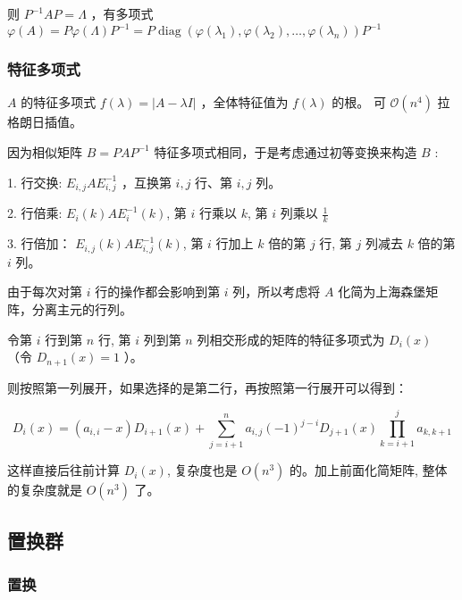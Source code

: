 \vspace{-0.2cm}

则 $P^{-1} A P=\Lambda$ ，有多项式 $\varphi(A)=P \varphi(\Lambda) P^{-1} = P \operatorname{diag}(\varphi(\lambda_1),\varphi(\lambda_2),\dots,\varphi(\lambda_n))P^{-1}$

\subsubsection*{特征多项式}

\vspace{-0.1cm}

$A$ 的特征多项式 $f(\lambda) = |A - \lambda I|$ ，全体特征值为 $f(\lambda)$ 的根。 可 $\mathcal{O}(n^4)$ 拉格朗日插值。

因为相似矩阵 $B=PAP^{-1}$ 特征多项式相同，于是考虑通过初等变换来构造 $B$ :

1. 行交换: $E_{i, j} A E_{i, j}^{-1}$ ，互换第 $i, j$ 行、第 $i, j$ 列。

2. 行倍乘: $E_{i}(k) A E_{i}^{-1}(k)$, 第 $i$ 行乘以 $k$, 第 $i$ 列乘以 $\frac{1}{k}$

3. 行倍加： $E_{i, j}(k) A E_{i, j}^{-1}(k)$, 第 $i$ 行加上 $k$ 倍的第 $j$ 行, 第 $j$ 列减去 $k$ 倍的第 $i$ 列。

由于每次对第 $i$ 行的操作都会影响到第 $i$ 列，所以考虑将 $A$ 化简为上海森堡矩阵，分离主元的行列。

\vspace{0.2cm}

令第 $i$ 行到第 $n$ 行, 第 $i$ 列到第 $n$ 列相交形成的矩阵的特征多项式为 $D_{i}(x)$ （令 $D_{n+1}(x)=1$ ）。

则按照第一列展开，如果选择的是第二行，再按照第一行展开可以得到：

\vspace{-0.3cm}

$$
D_{i}(x)=\left(a_{i, i}-x\right) D_{i+1}(x)+\sum_{j=i+1}^{n} a_{i, j}(-1)^{j-i} D_{j+1}(x) \prod_{k=i+1}^{j} a_{k, k+1}
$$

\vspace{-0.1cm}

这样直接后往前计算 $D_{i}(x)$, 复杂度也是 $O\left(n^3\right)$ 的。加上前面化简矩阵, 整体的复杂度就是 $O\left(n^3\right)$ 了。

\newpage

\subsection{置换群}

    \subsubsection*{置换}

